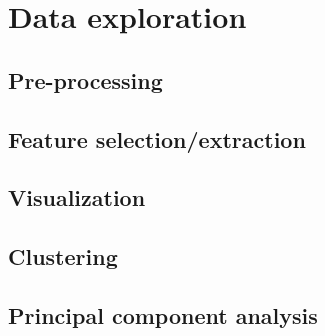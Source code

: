 
\section{Data exploration}%
\label{sec:data-exploration}

\subsection{Pre-processing}%
\label{sub:pre-processing}

\subsection{Feature selection/extraction}%
\label{sub:feature-selection}

\subsection{Visualization}%
\label{sub:visualization}

\subsection{Clustering}%
\label{sub:clustering}

\subsection{Principal component analysis}%
\label{sub:pca}
